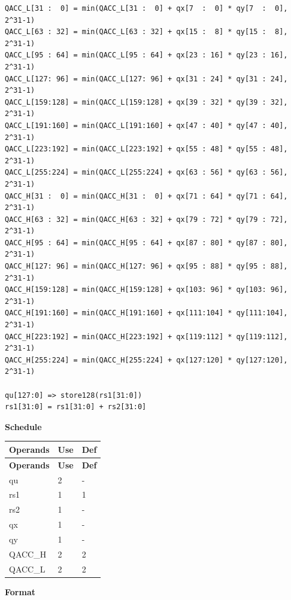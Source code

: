 \begin{lstlisting}
QACC_L[31 :  0] = min(QACC_L[31 :  0] + qx[7  :  0] * qy[7  :  0], 2^31-1)
QACC_L[63 : 32] = min(QACC_L[63 : 32] + qx[15 :  8] * qy[15 :  8], 2^31-1)
QACC_L[95 : 64] = min(QACC_L[95 : 64] + qx[23 : 16] * qy[23 : 16], 2^31-1)
QACC_L[127: 96] = min(QACC_L[127: 96] + qx[31 : 24] * qy[31 : 24], 2^31-1)
QACC_L[159:128] = min(QACC_L[159:128] + qx[39 : 32] * qy[39 : 32], 2^31-1)
QACC_L[191:160] = min(QACC_L[191:160] + qx[47 : 40] * qy[47 : 40], 2^31-1)
QACC_L[223:192] = min(QACC_L[223:192] + qx[55 : 48] * qy[55 : 48], 2^31-1)
QACC_L[255:224] = min(QACC_L[255:224] + qx[63 : 56] * qy[63 : 56], 2^31-1)
QACC_H[31 :  0] = min(QACC_H[31 :  0] + qx[71 : 64] * qy[71 : 64], 2^31-1)
QACC_H[63 : 32] = min(QACC_H[63 : 32] + qx[79 : 72] * qy[79 : 72], 2^31-1)
QACC_H[95 : 64] = min(QACC_H[95 : 64] + qx[87 : 80] * qy[87 : 80], 2^31-1)
QACC_H[127: 96] = min(QACC_H[127: 96] + qx[95 : 88] * qy[95 : 88], 2^31-1)
QACC_H[159:128] = min(QACC_H[159:128] + qx[103: 96] * qy[103: 96], 2^31-1)
QACC_H[191:160] = min(QACC_H[191:160] + qx[111:104] * qy[111:104], 2^31-1)
QACC_H[223:192] = min(QACC_H[223:192] + qx[119:112] * qy[119:112], 2^31-1)
QACC_H[255:224] = min(QACC_H[255:224] + qx[127:120] * qy[127:120], 2^31-1)

qu[127:0] => store128(rs1[31:0])
rs1[31:0] = rs1[31:0] + rs2[31:0]
\end{lstlisting}

\textbf{Schedule}\\
\begin{longtable}[c]{|l|l|l|}
    \hline
    \rowcolor{lightgray}
    \textbf{Operands} & \textbf{Use} & \textbf{Def} \\\hline
    \endfirsthead
    \hline
    \rowcolor{lightgray}
     \textbf{Operands} & \textbf{Use} & \textbf{Def} \\\hline
    \endhead
    \hline
    \endfoot

    qu & 2 & - \\\hline
    rs1 & 1 & 1 \\\hline
    rs2 & 1 & - \\\hline
     qx & 1 & - \\\hline
     qy & 1 & - \\\hline
     QACC\_H & 2 & 2 \\\hline
     QACC\_L & 2 & 2

\end{longtable}

\textbf{Format}\\

